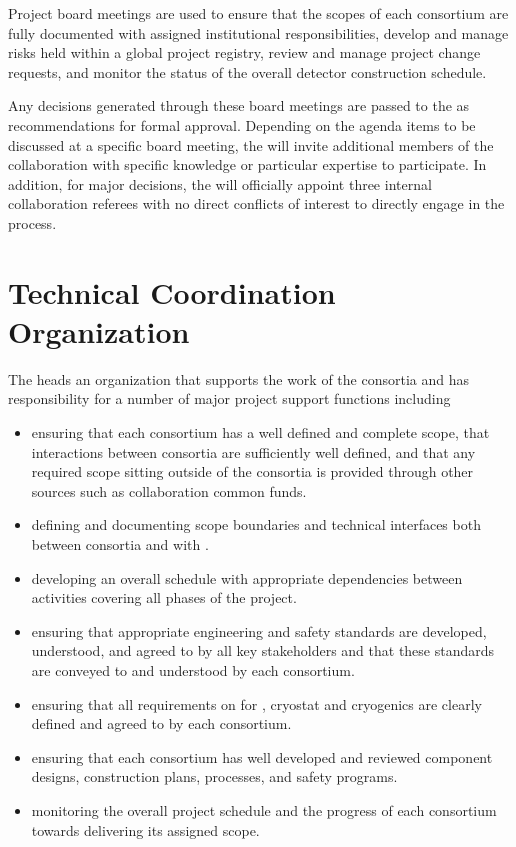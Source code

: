 Project board meetings are used to ensure that the scopes of each
consortium are fully documented with assigned institutional
responsibilities, develop and manage risks held within a global
project registry, review and manage project change requests, and
monitor the status of the overall detector construction schedule.

Any decisions generated through these board meetings are passed to 
the   as recommendations for formal approval.
Depending on the agenda items to be discussed at a specific board 
meeting, the  will invite additional members of the 
collaboration with specific knowledge or particular expertise to 
participate.  In addition, for major decisions, the  
will officially appoint three internal collaboration referees with 
no direct conflicts of interest to directly engage in the process.

\section{Technical Coordination Organization}
\label{sec:tco}

The  heads an organization that supports the work of 
the consortia and has responsibility for a number of major project 
support functions including

\begin{itemize}
\item ensuring that each consortium has a well defined and complete
  scope, that interactions between consortia are sufficiently 
  well defined, and that any required scope sitting outside of the 
  consortia is provided through other sources such as collaboration
  common funds.
\item defining and documenting scope boundaries and technical 
  interfaces both between consortia and with .  
\item developing an overall schedule with appropriate dependencies
  between activities covering all phases of the project. 
\item ensuring that appropriate engineering and safety standards 
  are developed, understood, and agreed to by all key stakeholders 
  and that these standards are conveyed to and understood by each
   consortium.
\item ensuring that all  requirements on  
  for , cryostat and cryogenics are clearly
  defined and agreed to by each consortium.
\item ensuring that each consortium has well developed and reviewed
  component designs, construction plans,  processes, and 
  safety programs.
\item monitoring the overall project schedule and the progress 
  of each consortium towards delivering its assigned scope. 
\end{itemize}
 
